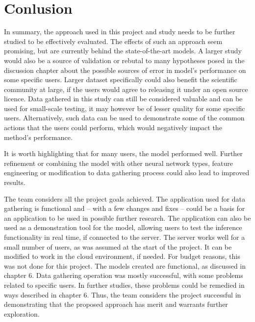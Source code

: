 
\chapter{Conlusion}

In summary, the approach used in this project and study needs to be further studied to be effectively evaluated. The effects of such an approach seem promising, but are currently behind the state-of-the-art models. A larger study would also be a source of validation or rebutal to many hypotheses posed in the discussion chapter about the possible sources of error in model's performance on some specific users. Larger dataset specifically could also benefit the scientific community at large, if the users would agree to releasing it under an open source licence. Data gathered in this study can still be considered valuable and can be used for small-scale testing, it may however be of lesser quality for some specific users. Alternatively, such data can be used to demonstrate some of the common actions that the users could perform, which would negatively impact the method's performance.

It is worth highlighting that for many users, the model performed well. Further refinement or combining the model with other neural network types, feature engineering or modification to data gathering process could also lead to improved results.

The team considers all the project goals achieved. The application used for data gathering is functional and -- with a few changes and fixes -- could be a basis for an application to be used in possible further research. The application can also be used as a demonstration tool for the model, allowing users to test the inference functionality in real time, if connected to the server. The server works well for a small number of users, as was assumed at the start of the project. It can be modified to work in the cloud environment, if needed. For budget reasons, this was not done for this project. The models created are functional, as discussed in chapter 6. Data gathering operation was mostly successful, with some problems related to specific users. In further studies, these problems could be remedied in ways described in chapter 6. Thus, the team considers the project successful in demonstrating that the proposed approach has merit and warrants further exploration.
